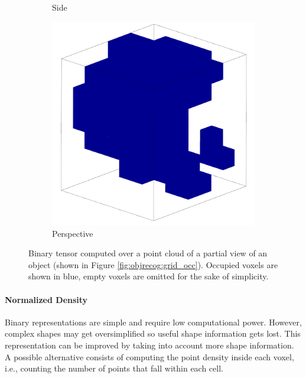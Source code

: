 \begin{figure}[!htb]
\begin{subfigure}{0.325\textwidth}
		\caption{Side}
		\label{subfig:objrecog:binary_occ:side}
	\end{subfigure}
	\hfill
	\begin{subfigure}{0.325\textwidth}
		\centering
		\includegraphics[width=\linewidth]{Figures/ObjRecog/binary_persp}
		\caption{Perspective}
		\label{subfig:objrecog:binary_occ:persp}
	\end{subfigure}
	\hfill
	\caption{Binary tensor computed over a point cloud of a partial view of an object (shown in Figure \ref{fig:objrecog:grid_occ}). Occupied voxels are shown in blue, empty voxels are omitted for the sake of simplicity.}
	\label{fig:objrecog:binary_occ}
\end{figure}

\paragraph{Normalized Density}

Binary representations are simple and require low computational power. However, complex shapes may get oversimplified so useful shape information gets lost. This representation can be improved by taking into account more shape information. A possible alternative consists of computing the point density inside each voxel, i.e., counting the number of points that fall within each cell.

